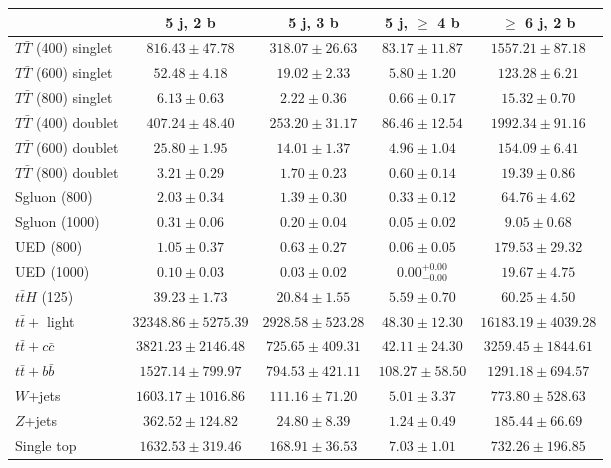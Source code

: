 
\begin{table}
\begin{center}
\begin{tabular}{l*{4}{c}}
\hline\hline
 & 5 j, 2 b & 5 j, 3 b & 5 j, $\geq$ 4 b & $\geq$ 6 j, 2 b\\
\hline
$T\bar{T}$ (400) singlet & $816.43 \pm 47.78$ & $318.07 \pm 26.63$ & $83.17 \pm 11.87$ & $1557.21 \pm 87.18$\\
$T\bar{T}$ (600) singlet & $52.48 \pm 4.18$ & $19.02 \pm 2.33$ & $5.80 \pm 1.20$ & $123.28 \pm 6.21$\\
$T\bar{T}$ (800) singlet & $6.13 \pm 0.63$ & $2.22 \pm 0.36$ & $0.66 \pm 0.17$ & $15.32 \pm 0.70$\\
$T\bar{T}$ (400) doublet & $407.24 \pm 48.40$ & $253.20 \pm 31.17$ & $86.46 \pm 12.54$ & $1992.34 \pm 91.16$\\
$T\bar{T}$ (600) doublet & $25.80 \pm 1.95$ & $14.01 \pm 1.37$ & $4.96 \pm 1.04$ & $154.09 \pm 6.41$\\
$T\bar{T}$ (800) doublet & $3.21 \pm 0.29$ & $1.70 \pm 0.23$ & $0.60 \pm 0.14$ & $19.39 \pm 0.86$\\
Sgluon (800) & $2.03 \pm 0.34$ & $1.39 \pm 0.30$ & $0.33 \pm 0.12$ & $64.76 \pm 4.62$\\
Sgluon (1000) & $0.31 \pm 0.06$ & $0.20 \pm 0.04$ & $0.05 \pm 0.02$ & $9.05 \pm 0.68$\\
UED (800) & $1.05 \pm 0.37$ & $0.63 \pm 0.27$ & $0.06 \pm 0.05$ & $179.53 \pm 29.32$\\
UED (1000) & $0.10 \pm 0.03$ & $0.03 \pm 0.02$ & $0.00_{-0.00}^{+0.00}$          & $19.67 \pm 4.75$\\
\hline
$t\bar{t}H$ (125) & $39.23 \pm 1.73$ & $20.84 \pm 1.55$ & $5.59 \pm 0.70$ & $60.25 \pm 4.50$\\
$t\bar{t}+$ light & $32348.86 \pm 5275.39$ & $2928.58 \pm 523.28$ & $48.30 \pm 12.30$ & $16183.19 \pm 4039.28$\\
$t\bar{t}+c\bar{c}$ & $3821.23 \pm 2146.48$ & $725.65 \pm 409.31$ & $42.11 \pm 24.30$ & $3259.45 \pm 1844.61$\\
$t\bar{t}+b\bar{b}$ & $1527.14 \pm 799.97$ & $794.53 \pm 421.11$ & $108.27 \pm 58.50$ & $1291.18 \pm 694.57$\\
$W$+jets & $1603.17 \pm 1016.86$ & $111.16 \pm 71.20$ & $5.01 \pm 3.37$ & $773.80 \pm 528.63$\\
$Z$+jets & $362.52 \pm 124.82$ & $24.80 \pm 8.39$ & $1.24 \pm 0.49$ & $185.44 \pm 66.69$\\
Single top & $1632.53 \pm 319.46$ & $168.91 \pm 36.53$ & $7.03 \pm 1.01$ & $732.26 \pm 196.85$\\

\end{tabular}
\end{center}
\end{table}
